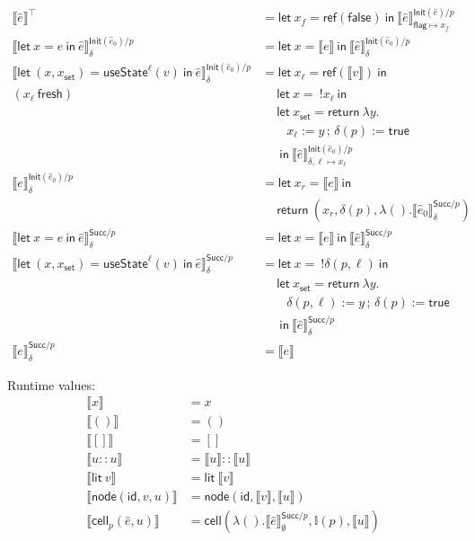 \documentclass{article}
\newcommand{\mf}[1]{\mathsf{#1}}
\newcommand{\semi}{\,;\,}
\newcommand{\llrr}[1]{\llbracket #1 \rrbracket}
\newcommand{\I}{\mathbb{I}}
\newcommand{\elet}[3]{\mf{let}\ #1 = #2\ \mf{in}\ #3}
\newcommand{\eret}[1]{\mf{return}\ #1}
\newcommand{\estate}[4]{\mf{let}\ (#1, #1_{\mf{set}}) = \mf{useState}^{#2}(#3)\ \mf{in}\ #4}
\newcommand{\eref}[1]{\mf{ref}(#1)}
\newcommand{\eget}[1]{\ !#1}
\newcommand{\eset}[2]{#1 := #2}
\newcommand{\elit}[1]{\mf{lit}\ #1}
\newcommand{\enode}[3]{\mf{node}(\mf{#1}, #2, #3)}
\begin{document}
\begin{align*}
\llrr{\hat{e}}^\top &= \elet{x_f}{\eref{\mf{false}}}
{\llrr{\hat{e}}^{\mf{Init}(\hat{e})/p}_{\mf{flag} \mapsto x_f}}\\
\llrr{\elet{x}{e}{\hat{e}}}^{\mf{Init}(\hat{e}_0)/p}_{\delta}
&= \elet{x}{\llrr{e}}{\llrr{\hat{e}}^{\mf{Init}(\hat{e}_0)/p}_\delta}\\
\llrr{\estate{x}{\ell}{v}{\hat{e}}}^{\mf{Init}(\hat{e}_0)/p}_\delta
&= \elet{x_\ell}{\eref{\llrr{v}}}{\\
  (x_\ell\ \mf{fresh})\quad&\quad\ \elet{x}{\eget{x_\ell}}{\\
    &\quad\ \elet{x_\mf{set}}{\eret{\lambda y.\\
      &\qquad
      \eset{x_\ell}{y} \semi \eset{\delta(p)}{\mf{true}}}\\&\quad\ }{
       \llrr{\hat{e}}^{\mf{Init}(\hat{e}_0)/p}_{\delta,\ell \mapsto x_\ell}
    }
  }
}\\
\llrr{e}^{\mf{Init}(\hat{e}_0)/p}_\delta
&= \elet{x_r}{\llrr{e}}{\\
  &\quad\ \eret{(x_r,\delta(p),\lambda ().\llrr{\hat{e}_0}^{\mf{Succ}/p}_\delta)}
}\\
\llrr{\elet{x}{e}{\hat{e}}}^{\mf{Succ}/p}_\delta
&= \elet{x}{\llrr{e}}{\llrr{\hat{e}}^{\mf{Succ}/p}_\delta}\\
\llrr{\estate{x}{\ell}{v}{\hat{e}}}^{\mf{Succ}/p}_\delta
&= \elet{x}{\eget{\delta(p, \ell)}}{\\
    &\quad\ \elet{x_\mf{set}}{\eret{\lambda y.\\
      &\qquad \eset{\delta(p, \ell)}{y} 
        \semi 
        \eset{\delta(p)}{\mf{true}}
      \\&\quad\
    }}
  \llrr{\hat{e}}^{\mf{Succ}/p}_\delta}
\\
\llrr{e}^{\mf{Succ}/p}_\delta &= \llrr{e}
\end{align*}

Runtime values:
\begin{align*}
\llrr{x} &= x\\
\llrr{()} &= ()\\
\llrr{[]} &= []\\
\llrr{u :: u} &= \llrr{u} :: \llrr{u}\\
\llrr{\elit{v}} &= \elit{\llrr{v}}\\
\llrr{\enode{id}{v}{u}} &= \enode{id}{\llrr{v}}{\llrr{u}}\\
\llrr{\mf{cell}_p(\hat{e}, u)} 
&= \mf{cell}(
  \lambda ().\llrr{\hat{e}}^{\mf{Succ}/p}_\emptyset,
  \I(p),
  \llrr{u}
)
\end{align*}
\end{document}
